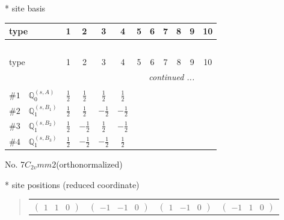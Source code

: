 \documentclass[fleqn,9pt,landscape]{jsarticle}
\begin{document}
* site basis
\begin{center}
\renewcommand{\arraystretch}{1.3}
\begin{longtable}{lcccccccccc}
 \hline \hline
type & 1 & 2 & 3 & 4 & 5 & 6 & 7 & 8 & 9 & 10 \\ \hline \endfirsthead

\multicolumn{10}{l}{\tablename\ \thetable{}} \\
 \hline \hline
type & 1 & 2 & 3 & 4 & 5 & 6 & 7 & 8 & 9 & 10 \\ \hline \endhead

 \hline \hline
\multicolumn{10}{r}{\footnotesize\it continued ...} \\ \endfoot

 \hline \hline
\multicolumn{10}{r}{} \\ \endlastfoot

$ \#1\quad \mathbb{Q}_{0}^{(s,A)} $ & $ \frac{1}{2} $ & $ \frac{1}{2} $ & $ \frac{1}{2} $ & $ \frac{1}{2} $ \\ \hline
$ \#2\quad \mathbb{Q}_{1}^{(s,B_{1})} $ & $ \frac{1}{2} $ & $ \frac{1}{2} $ & $ - \frac{1}{2} $ & $ - \frac{1}{2} $ \\ \hline
$ \#3\quad \mathbb{Q}_{1}^{(s,B_{2})} $ & $ \frac{1}{2} $ & $ - \frac{1}{2} $ & $ \frac{1}{2} $ & $ - \frac{1}{2} $ \\ \hline
$ \#4\quad \mathbb{Q}_{1}^{(s,B_{3})} $ & $ \frac{1}{2} $ & $ - \frac{1}{2} $ & $ - \frac{1}{2} $ & $ \frac{1}{2} $ \\
\end{longtable}
\end{center}
\newpage
\begin{center}
\LARGE
No. 7\quad$C_{2v}$\quad$mm2$\quad[ orthorhombic ] (orthonormalized)
\end{center}
\vspace{5mm}
* site positions (reduced coordinate)
\begin{quote}
\begin{tabular}{cccc}
$ \begin{pmatrix} 1 & 1 & 0 \end{pmatrix} $ & $ \begin{pmatrix} -1 & -1 & 0 \end{pmatrix} $ & $ \begin{pmatrix} 1 & -1 & 0 \end{pmatrix} $ & $ \begin{pmatrix} -1 & 1 & 0 \end{pmatrix} $
\end{tabular}
\end{quote}
\end{document}
